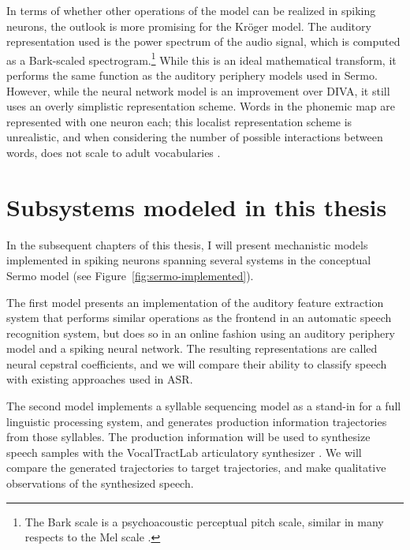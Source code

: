 In terms of whether other operations
of the model can be realized in spiking neurons,
the outlook is more promising
for the Kr\"{o}ger model.
The auditory representation used
is the power spectrum of the audio signal,
which is computed as a Bark-scaled spectrogram.\footnote{
  The Bark scale is a psychoacoustic
  perceptual pitch scale,
  similar in many respects to the Mel scale
  \citep{zwicker1961}.}
While this is an ideal mathematical transform,
it performs the same function as the
auditory periphery models used in Sermo.
However, while the neural network model
is an improvement over DIVA,
it still uses an overly simplistic
representation scheme.
Words in the phonemic map
are represented with one neuron each;
this localist representation scheme is unrealistic,
and when considering the number of possible
interactions between words,
does not scale to adult vocabularies
\citep{crawford2014}.

\section{Subsystems modeled in this thesis}

In the subsequent chapters of this thesis,
I will present mechanistic models
implemented in spiking neurons
spanning several systems
in the conceptual Sermo model
(see Figure~\ref{fig:sermo-implemented}).


The first model presents an implementation
of the auditory feature extraction system
that performs similar operations as
the frontend in an automatic speech recognition system,
but does so in an online fashion
using an auditory periphery model
and a spiking neural network.
The resulting representations are called
neural cepstral coefficients,
and we will compare their ability
to classify speech with
existing approaches used in ASR.

The second model implements
a syllable sequencing model
as a stand-in for a
full linguistic processing system,
and generates production information trajectories
from those syllables.
The production information will be
used to synthesize speech samples
with the VocalTractLab articulatory synthesizer
\citep{birkholz2006,birkholz2013}.
We will compare the generated trajectories
to target trajectories,
and make qualitative observations
of the synthesized speech.

